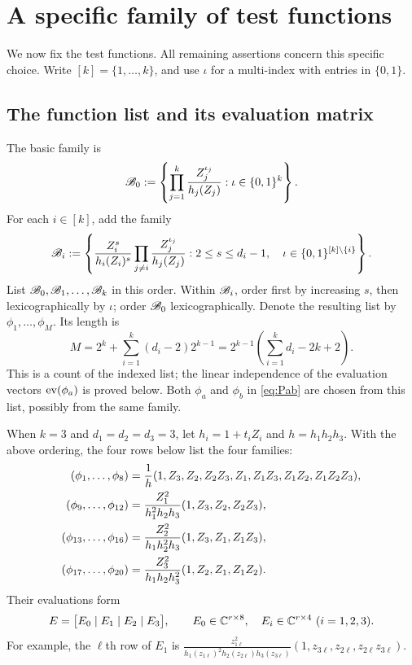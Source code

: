 \section{A specific family of test functions}\label{sec:tests}

We now fix the test functions. All remaining assertions concern this
specific choice. Write $[k]=\{1,\ldots,k\}$, and use $\iota$ for a
multi-index with entries in $\{0,1\}$.

\subsection{The function list and its evaluation matrix}
The basic family is
\begin{equation}\label{eq:B0}
\mathscr B_0:=\left\{
\prod_{j=1}^k\frac{Z_j^{\iota_j}}{h_j(Z_j)}:
\iota\in\{0,1\}^k\right\}.
\end{equation}
For each $i\in[k]$, add the family
\begin{equation}\label{eq:Bi}
\mathscr B_i:=\left\{
\frac{Z_i^s}{h_i(Z_i)^s}
\prod_{j\ne i}\frac{Z_j^{\iota_j}}{h_j(Z_j)}:
2\le s\le d_i-1,\quad
\iota\in\{0,1\}^{[k]\setminus\{i\}}\right\}.
\end{equation}
List $\mathscr B_0,\mathscr B_1,\ldots,\mathscr B_k$ in this order. Within $\mathscr B_i$,
order first by increasing $s$, then lexicographically by $\iota$;
order $\mathscr B_0$ lexicographically. Denote the resulting list by
$\phi_1,\ldots,\phi_M$. Its length is
\begin{equation}\label{eq:Mcount}
M=2^k+\sum_{i=1}^k(d_i-2)2^{k-1}
=2^{k-1}\left(\sum_{i=1}^k d_i-2k+2\right).
\end{equation}
This is a count of the indexed list; the linear independence of the
evaluation vectors $\operatorname{ev}(\phi_a)$ is proved below. Both $\phi_a$ and $\phi_b$ in \eqref{eq:Pab} are chosen from
this list, possibly from the same family.

\begin{example}\label{ex:list}
When $k=3$ and $d_1=d_2=d_3=3$, let $h_i=1+t_iZ_i$ and
$h=h_1h_2h_3$. With the above ordering, the four rows below list the
four families:
\begin{align}
(\phi_1,\ldots,\phi_8)
&=\frac1h(1,Z_3,Z_2,Z_2Z_3,Z_1,Z_1Z_3,Z_1Z_2,Z_1Z_2Z_3),\label{eq:cubic-basic}\\
(\phi_9,\ldots,\phi_{12})
&=\frac{Z_1^2}{h_1^2h_2h_3}(1,Z_3,Z_2,Z_2Z_3),\notag\\
(\phi_{13},\ldots,\phi_{16})
&=\frac{Z_2^2}{h_1h_2^2h_3}(1,Z_3,Z_1,Z_1Z_3),\notag\\
(\phi_{17},\ldots,\phi_{20})
&=\frac{Z_3^2}{h_1h_2h_3^2}(1,Z_2,Z_1,Z_1Z_2).\notag
\end{align}
Their evaluations form
\begin{equation}\label{eq:cubic-E}
E=\bigl[E_0\mid E_1\mid E_2\mid E_3\bigr],
\qquad E_0\in\C^{r\times8},\quad E_i\in\C^{r\times4}\ (i=1,2,3).
\end{equation}
For example, the $\ell$th row of $E_1$ is
$\frac{z_{1\ell}^2}{h_1(z_{1\ell})^2h_2(z_{2\ell})h_3(z_{3\ell})}
(1,z_{3\ell},z_{2\ell},z_{2\ell}z_{3\ell})$.
\end{example}


